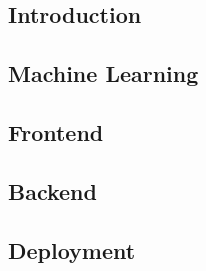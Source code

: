 \subsection{Introduction}


\subsection{Machine Learning}


\subsection{Frontend}


\subsection{Backend}


\subsection{Deployment}
